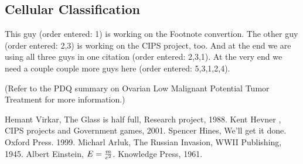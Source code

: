 \documentclass[12pt]{article}
\newcounter{qC}
\begin{document}
\begin{cbunit}

\section{Cellular Classification}

\setcounter{qC}{0}
This guy \cite{1} (order entered: 1) is working on the Footnote convertion.
The other guy \cite{2,3} (order entered: 2,3) is working on the CIPS project, too. 
And at the end
we are using all three guys in one citation \cite{2,3,1} (order entered: 2,3,1). 
At the very end
we need a couple couple more guys here \cite{5,3,1,2,4} (order entered: 5,3,1,2,4).

\setcounter{qC}{0}
(Refer to the PDQ summary on Ovarian Low Malignant Potential Tumor Treatment
for more information.)

% 
\begin{thebibliography}{100}
 Hemant Virkar, The Glass is half full, Research project, 1988.   
 Kent Hevner , CIPS projects and Government games, 2001. 
 Spencer Hines, We'll get it done.  Oxford Press. 1999. 
 Micharl Arluk, The Russian Invasion, WWII Publishing, 1945.
 Albert Einstein, $E = {m \over c^2}$.  Knowledge Press, 1961.
\end{thebibliography}
\end{cbunit}
\end{document}
